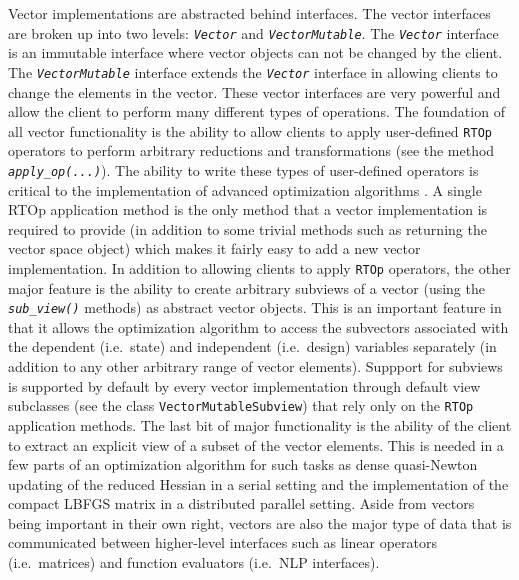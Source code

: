 \documentclass[pdf,ps2pdf,11pt]{SANDreport}
\begin{document}
Vector implementations are abstracted behind interfaces.  The vector
interfaces are broken up into two levels: {}\texttt{\textit{Vector}} and
{}\texttt{\textit{Vector\-Mutable}}.  The {}\texttt{\textit{Vector}} interface
is an immutable interface where vector objects can not be changed by the
client.  The {}\texttt{\textit{Vector\-Mutable}} interface extends the
{}\texttt{\textit{Vector}} interface in allowing clients to change the
elements in the vector.  These vector interfaces are very powerful and allow
the client to perform many different types of operations.  The foundation of
all vector functionality is the ability to allow clients to apply user-defined
{}\texttt{RTOp} operators to perform arbitrary reductions and transformations
(see the method {}\texttt{\textit{apply\_op(...)}}). The ability to write
these types of user-defined operators is critical to the implementation of
advanced optimization algorithms {}\cite{ref:rtop_toms}.  A single RTOp
application method is the only method that a vector implementation is required
to provide (in addition to some trivial methods such as returning the vector
space object) which makes it fairly easy to add a new vector implementation.
In addition to allowing clients to apply {}\texttt{RTOp} operators, the other
major feature is the ability to create arbitrary subviews of a vector (using
the {}\texttt{\textit{sub\_view()}} methods) as abstract vector objects.  This
is an important feature in that it allows the optimization algorithm to access
the subvectors associated with the dependent (i.e.\ state) and independent
(i.e.\ design) variables separately (in addition to any other arbitrary range
of vector elements).  Suppport for subviews is supported by default by every
vector implementation through default view subclasses (see the class
{}\texttt{Vector\-Mutable\-Subview}) that rely only on the {}\texttt{RTOp}
application methods.  The last bit of major functionality is the ability of
the client to extract an explicit view of a subset of the vector elements.
This is needed in a few parts of an optimization algorithm for such tasks as
dense quasi-Newton updating of the reduced Hessian in a serial setting and the
implementation of the compact LBFGS matrix in a distributed parallel setting.
Aside from vectors being important in their own right, vectors are also the
major type of data that is communicated between higher-level interfaces such
as linear operators (i.e.\ matrices) and function evaluators (i.e.\ NLP
interfaces).
\end{document}
